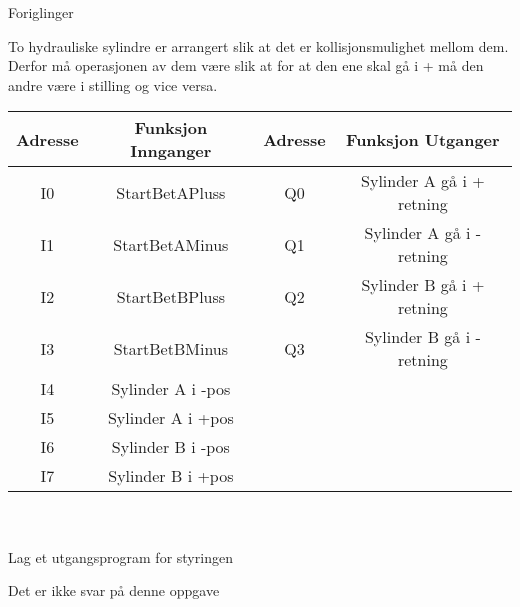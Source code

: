 


Foriglinger

To hydrauliske sylindre er arrangert slik at det er kollisjonsmulighet
mellom dem. Derfor må operasjonen av dem være slik at for at den ene
skal gå i + må den andre være i \textendash stilling og vice versa. 

\begin{tabular}{|c|c|c|c|}
\hline 
Adresse & Funksjon Innganger & Adresse & Funksjon Utganger\tabularnewline
\hline 
\hline 
I0 & StartBetAPluss & Q0 & Sylinder A gå i + retning\tabularnewline
\hline 
I1 & StartBetAMinus  & Q1 & Sylinder A gå i - retning\tabularnewline
\hline 
I2 & StartBetBPluss   & Q2 & Sylinder B gå i + retning\tabularnewline
\hline 
I3 & StartBetBMinus   & Q3 & Sylinder B gå i - retning\tabularnewline
\hline 
I4 & Sylinder A i -pos &  & \tabularnewline
\hline 
I5 & Sylinder A i +pos &  & \tabularnewline
\hline 
I6 & Sylinder B i -pos &  & \tabularnewline
\hline 
I7 & Sylinder B i +pos &  & \tabularnewline
\hline 
\end{tabular}
\\
\\
Lag et utgangsprogram for styringen
\vskip 10pt






Det er ikke svar på denne oppgave












